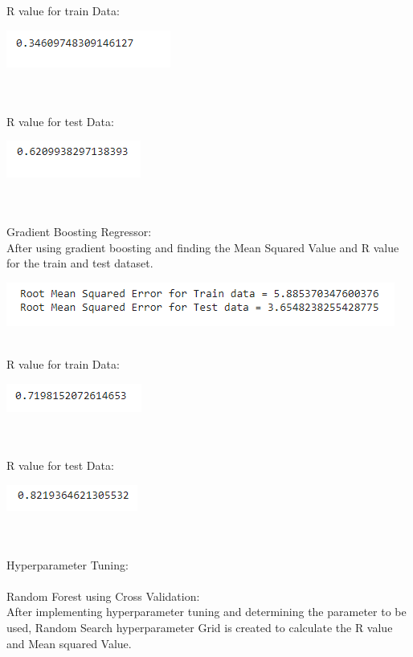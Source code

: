 \documentclass[journal,twoside,web]{ieeecolor}
\begin{document}
\\
\\
R value for train Data:
\begin{center}
\includegraphics[scale=0.60]{Picture27.png}
\end{center}
\\
\\
R value for test Data:
\begin{center}
\includegraphics[scale=0.60]{Picture28.png}
\end{center}
\\
\\
Gradient Boosting Regressor:
\\
After using gradient boosting and finding the Mean Squared Value and R value for the train and test dataset.
\begin{center}
\includegraphics[scale=0.60]{Picture29.png}
\end{center}
\\
R value for train Data:
\begin{center}
\includegraphics[scale=0.60]{Picture30.png}
\end{center}
\\
\\
R value for test Data:
\begin{center}
\includegraphics[scale=0.60]{Picture31.png}
\end{center}
\\
\\
Hyperparameter Tuning:
\\
\\
Random Forest using Cross Validation:
\\
After implementing hyperparameter tuning and determining the parameter to be used, Random Search hyperparameter Grid is created to calculate the R value and Mean squared Value.
\end{document}

